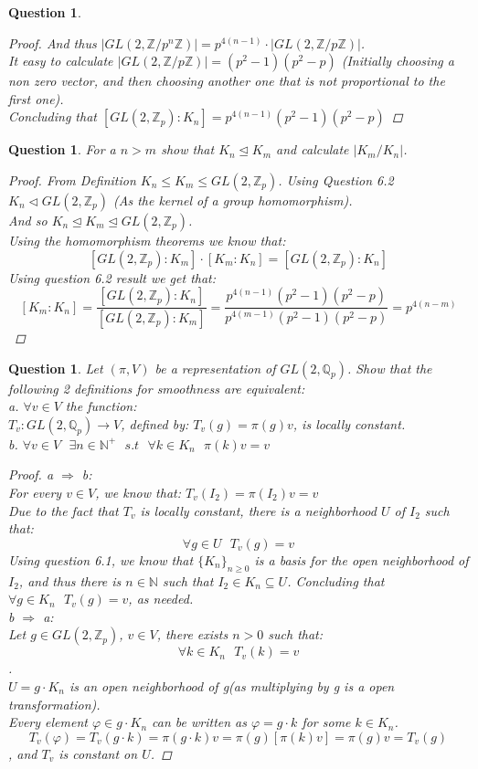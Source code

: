 \documentclass[11pt]{article}
\newtheorem{quest}[thm]{Question}
\theoremstyle{definition}
\theoremstyle{lemma}
\theoremstyle{conclusion}
\def\zint{\mathbb{Z}}
\def\zp{\zint_{p}}
\def\qp{\mathbb{Q}_{p}}
\def\zmodnz#1{\zint/#1\zint}
\def\zmodpz{\zmodnz p}
\def\zmodpnz{\zmodnz{p^{n}}}
\def\gl#1{GL(2, #1)}
\def\glzp{\gl{\zp}}
\def\glqp{\gl{\qp}}
\numberwithin{equation}{section}
\begin{document}
\begin{quest}
\begin{enumerate}
\begin{proof}
And thus $|\gl {\zmodpnz}| = p^{4(n-1)}\cdot |\gl {\zmodpz}|$.\\ 
It easy to calculate $|\gl {\zmodpz}| = (p^2 - 1)(p^2 - p)$ (Initially choosing a non zero vector, and then choosing another one that is not proportional to the first one). 
\\Concluding that $[\glzp:K_n] = p^{4(n-1)} (p^2 - 1)(p^2 - p)$
\end{proof}

\end{enumerate}
\end{quest}
\begin{quest} %
For a $n > m$ show that $K_n \unlhd K_m$ and calculate $|K_m/K_n|$.
\begin{proof}
From Definition $K_n \leqslant K_m \leqslant \glzp$. Using Question 6.2 $K_n \lhd \glzp $ (As the kernel of a group homomorphism). 
\\ And so $K_n \unlhd K_m \unlhd \glzp$. 
\\ Using the homomorphism theorems we know that: 
$$[\glzp : K_m]\cdot[K_m:K_n] = [\glzp:K_n]$$
Using question 6.2 result we get that:
$$[K_m:K_n] = \frac{[\glzp:K_n]}{[\glzp : K_m]} = \frac{p^{4(n-1)} (p^2 - 1)(p^2 - p)}{p^{4(m-1)} (p^2 - 1)(p^2 - p)} = p^{4(n-m)}$$
\end{proof}
\end{quest}
\begin{quest}%
Let $(\pi, V)$ be a representation of $\glqp$. Show that the following 2 definitions for smoothness are equivalent:
\\a. $\forall v \in V$ the function:
\\ $T_v: \gl \qp \rightarrow V$, defined by: $T_v(g) = \pi(g)v$, is locally constant.
\\b. $\forall v \in V \textbf{ } \exists n \in \mathbb{N}^+ \textbf{ }s.t \textbf{ }\forall k \in K_n \textbf{ }\pi(k)v=v$
\begin{proof}
a $\Rightarrow$ b:
\\ For every $v \in V$, we know that: $T_v(I_2) = \pi(I_2)v = v$
\\ Due to the fact that $T_v$ is locally constant, there is a neighborhood $U$ of $I_2$ such that:
$$\forall g \in U \textbf{ } T_v(g) = v$$
Using question 6.1, we know that $\{K_n\}_{n\geq0}$ is a basis for the open neighborhood of $I_2$, and thus there is $n \in \mathbb{N}$ such that $I_2 \in K_n \subseteq U $. Concluding that $\forall g \in K_n \textbf{ } T_v(g) = v$, as needed.
\\ b $\Rightarrow$ a:
\\ Let $g \in \glzp$, $v \in V$, there exists $n>0$ such that:
$$\forall k \in K_n \textbf{ } T_v(k) = v$$. 
\\ $U = g \cdot K_n$ is an open neighborhood of g(as multiplying by g is a open transformation).
\\ Every element $\varphi \in g \cdot K_n$ can be written as $\varphi = g \cdot k$ for some $k \in K_n$.
$$T_v(\varphi)=T_v(g \cdot k)=\pi(g\cdot k)v = \pi(g)[\pi(k)v]=\pi(g)v=T_v(g)$$, and  $T_v$ is constant on $U$.
\end{proof}
\end{quest}
\end{document}
